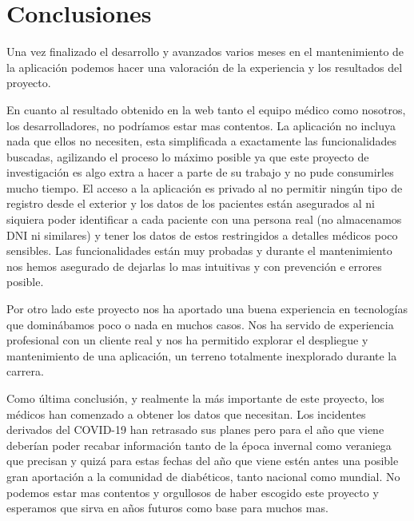 \chapter{Conclusiones}
    
    Una vez finalizado el desarrollo y avanzados varios meses en el mantenimiento de la aplicación podemos hacer una valoración de la experiencia y los resultados del proyecto.
    \newline
    
    En cuanto al resultado obtenido en la web tanto el equipo médico como nosotros, los desarrolladores, no podríamos estar mas contentos. La aplicación no incluya nada que ellos no necesiten, esta simplificada a exactamente las funcionalidades buscadas, agilizando el proceso lo máximo posible ya que este proyecto de investigación es algo extra a hacer a parte de su trabajo y no pude consumirles mucho tiempo. El acceso a la aplicación es privado al no permitir ningún tipo de registro desde el exterior y los datos de los pacientes están asegurados al ni siquiera poder identificar a cada paciente con una persona real (no almacenamos DNI ni similares) y tener los datos de estos restringidos a detalles médicos poco sensibles. Las funcionalidades están muy probadas y durante el mantenimiento nos hemos asegurado de dejarlas lo mas intuitivas y con prevención e errores posible.
    \newline
    
    Por otro lado este proyecto nos ha aportado una buena experiencia en tecnologías que dominábamos poco o nada en muchos casos. Nos ha servido de experiencia profesional con un cliente real y nos ha permitido explorar el despliegue y mantenimiento de una aplicación, un terreno totalmente inexplorado durante la carrera.
    \newline
    
    Como última conclusión, y realmente la más importante de este proyecto, los médicos han comenzado a obtener los datos que necesitan. Los incidentes derivados del COVID-19 han retrasado sus planes pero para el año que viene deberían poder recabar información tanto de la época invernal como veraniega que precisan y quizá para estas fechas del año que viene estén antes una posible gran aportación a la comunidad de diabéticos, tanto nacional como mundial. No podemos estar mas contentos y orgullosos de haber escogido este proyecto y esperamos que sirva en años futuros como base para muchos mas.
